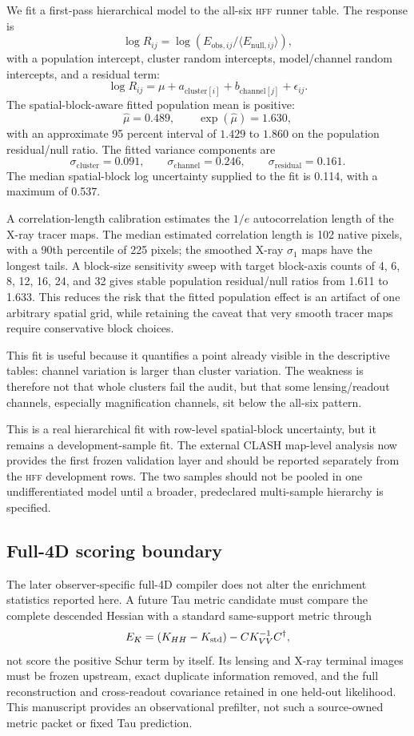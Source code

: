\documentclass[11pt,a4paper]{article}
\newcommand{\HFF}{\textsc{hff}}
\begin{document}
We fit a first-pass hierarchical model to the all-six \HFF{} runner table. The
response is
\[
\log R_{ij} =
\log\left(E_{\mathrm{obs},ij}/\langle E_{\mathrm{null},ij}\rangle\right),
\]
with a population intercept, cluster random intercepts, model/channel random
intercepts, and a residual term:
\[
\log R_{ij} = \mu + a_{\mathrm{cluster}[i]} + b_{\mathrm{channel}[j]} +
\epsilon_{ij}.
\]
The spatial-block-aware fitted population mean is positive:
\[
\hat{\mu}=0.489,\qquad
\exp(\hat{\mu})=1.630,
\]
with an approximate 95 percent interval of \(1.429\) to \(1.860\) on the
population residual/null ratio. The fitted variance components are
\[
\sigma_{\mathrm{cluster}}=0.091,\qquad
\sigma_{\mathrm{channel}}=0.246,\qquad
\sigma_{\mathrm{residual}}=0.161.
\]
The median spatial-block log uncertainty supplied to the fit is 0.114, with a
maximum of 0.537.

A correlation-length calibration estimates the \(1/e\) autocorrelation length
of the X-ray tracer maps. The median estimated correlation length is 102 native
pixels, with a 90th percentile of 225 pixels; the smoothed X-ray
\(\sigma_1\) maps have the longest tails. A block-size sensitivity sweep with
target block-axis counts of 4, 6, 8, 12, 16, 24, and 32 gives stable population
residual/null ratios from 1.611 to 1.633. This reduces the risk that the fitted
population effect is an artifact of one arbitrary spatial grid, while retaining
the caveat that very smooth tracer maps require conservative block choices.

This fit is useful because it quantifies a point already visible in the
descriptive tables: channel variation is larger than cluster variation. The
weakness is therefore not that whole clusters fail the audit, but that some
lensing/readout channels, especially magnification channels, sit below the
all-six pattern.

This is a real hierarchical fit with row-level spatial-block uncertainty, but
it remains a development-sample fit. The external CLASH map-level analysis now
provides the first frozen validation layer and should be reported separately
from the \HFF{} development rows. The two samples should not be pooled in one
undifferentiated model until a broader, predeclared multi-sample hierarchy is
specified.

\subsection{Full-4D scoring boundary}

The later observer-specific full-4D compiler does not alter the enrichment
statistics reported here.  A future Tau metric candidate must compare the
complete descended Hessian with a standard same-support metric through
\[
 E_K=(K_{HH}-K_{\rm std})-CK_{VV}^{-1}C^\dagger,
\]
not score the positive Schur term by itself.  Its lensing and X-ray terminal
images must be frozen upstream, exact duplicate information removed, and the
full reconstruction and cross-readout covariance retained in one held-out
likelihood.  This manuscript provides an observational prefilter, not such a
source-owned metric packet or fixed Tau prediction.
\end{document}

